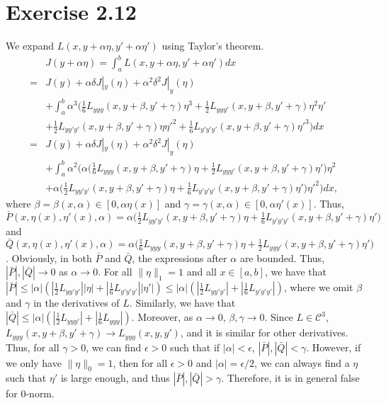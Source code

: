 \documentclass[11pt]{report}
\begin{document}
\section*{Exercise 2.12}
We expand $L(x,y+\alpha \eta, y'+\alpha \eta')$ using Taylor's theorem.
\begin{align*}
& J(y+\alpha \eta) = \int_a^b L(x,y+\alpha \eta, y'+\alpha \eta') dx\\
= & J(y) + \alpha \delta J|_y(\eta) + \alpha^2 \delta^2 J|_y(\eta)\\ &+ \int_a^b \alpha^3 \Big(\frac{1}{6} L_{yyy}(x,y+\beta, y'+\gamma)\eta^3 + \frac{1}{2} L_{yyy'}(x,y+\beta, y'+\gamma)\eta^2\eta'\\ &+ \frac{1}{2} L_{yy'y'}(x,y+\beta, y'+\gamma)\eta\eta'^2 + \frac{1}{6} L_{y'y'y'}(x,y+\beta, y'+\gamma)\eta'^3\Big)dx\\
= & J(y) + \alpha \delta J|_y(\eta) + \alpha^2 \delta^2 J|_y(\eta)\\ &+ \int_a^b \alpha^2 \Big(\alpha\big(\frac{1}{6} L_{yyy}(x,y+\beta, y'+\gamma)\eta + \frac{1}{2} L_{yyy'}(x,y+\beta, y'+\gamma)\eta'\big)\eta^2\\ &+ \alpha\big(\frac{1}{2} L_{yy'y'}(x,y+\beta, y'+\gamma)\eta + \frac{1}{6} L_{y'y'y'}(x,y+\beta, y'+\gamma)\eta'\big)\eta'^2\Big)dx,
\end{align*}
where $\beta = \beta(x,\alpha) \in [0, \alpha\eta(x)]$ and $\gamma = \gamma(x,\alpha) \in [0, \alpha\eta'(x)]$. Thus, $\bar{P}(x,\eta(x),\eta'(x),\alpha) = \alpha\big(\frac{1}{2} L_{yy'y'}(x,y+\beta, y'+\gamma)\eta + \frac{1}{6} L_{y'y'y'}(x,y+\beta, y'+\gamma)\eta'\big)$ and $\bar{Q}(x,\eta(x),\eta'(x),\alpha) = \alpha\big(\frac{1}{6} L_{yyy}(x,y+\beta, y'+\gamma)\eta + \frac{1}{2} L_{yyy'}(x,y+\beta, y'+\gamma)\eta'\big)$. Obviously, in both $\bar{P}$ and $\bar{Q}$, the expressions after $\alpha$ are bounded. Thus, $|\bar{P}|, |\bar{Q}| \to 0$ as $\alpha \to 0$. For all $\|\eta\|_1 = 1$ and all $x \in [a,b]$, we have that $|\bar{P}| \leq |\alpha|\left(\left|\frac{1}{2}L_{yy'y'}\right|\left|\eta\right| + \left|\frac{1}{6}L_{y'y'y'}\right|\left|\eta'\right|\right) \leq |\alpha|\left(\left|\frac{1}{2}L_{yy'y'}\right| + \left|\frac{1}{6}L_{y'y'y'}\right|\right)$, where we omit $\beta$ and $\gamma$ in the derivatives of $L$. Similarly, we have that $|\bar{Q}| \leq |\alpha|\left(\left|\frac{1}{2}L_{yyy'}\right| + \left|\frac{1}{6}L_{yyy}\right|\right)$. Moreover, as $\alpha \to 0$, $\beta, \gamma \to 0$. Since $L \in \mathcal{C}^3$, $L_{yyy}(x, y+\beta, y'+\gamma) \to L_{yyy}(x, y, y')$, and it is similar for other derivatives. Thus, for all $\gamma > 0$, we can find $\epsilon > 0$ such that if $|\alpha| < \epsilon$, $|\bar{P}|, |\bar{Q}| < \gamma$. However, if we only have $\|\eta\|_0 = 1$, then for all $\epsilon > 0$ and $|\alpha| = \epsilon / 2$, we can always find a $\eta$ such that $\eta'$ is large enough, and thus $|\bar{P}|, |\bar{Q}| > \gamma$. Therefore, it is in general false for $0$-norm.
\end{document}
